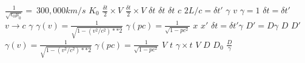 \documentclass{article}
\begin{document}
$\frac{1}{\sqrt{\epsilon_0 \mu_0}} = ~300,000km/s$
$K_0$
$\frac{\delta t}{2} \times V$
$\frac{\delta t}{2} \times V$
$\delta t$
$\delta t$
$\delta t$
$c$
$2L/c = \delta t'$
$\gamma$
$v$
$\gamma=1$
$\delta t = \delta t'$
$v \to c$
$\gamma$
$\gamma(v) = \frac{1}{\sqrt{1-(v^2/c^2)**2}}$
$\gamma(pc) = \frac{1}{\sqrt{1-pc^2}}$
$x$
$x'$
$\delta t  = \delta t' \gamma$
$D' = D \gamma$
$D$
$D'$
$\gamma(v) = \frac{1}{\sqrt{1-(v^2/c^2)**2}}$
$\gamma(pc) = \frac{1}{\sqrt{1-pc^2}}$
$V$
$t$
$\gamma \times t$
$V$
$D$
$D_0$
$\frac{D}{\gamma}$
\end{document}
